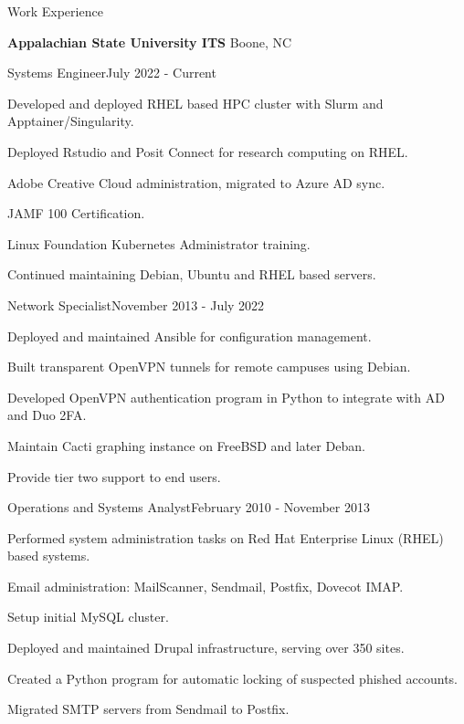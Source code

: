 \documentclass{new_cv} %
\begin{document}
\begin{rSection}{Work Experience}
	
 {\bf  {Appalachian State University ITS}} \hfill {Boone, NC}
 
   \begin{rSubsection}{Systems Engineer}{July 2022 - Current}
	\item Developed and deployed RHEL based HPC cluster with Slurm and Apptainer/Singularity.
	\item Deployed Rstudio and Posit Connect for research computing on RHEL.
 	\item Adobe Creative Cloud administration, migrated to Azure AD sync.
 	\item JAMF 100 Certification.
 	\item Linux Foundation Kubernetes Administrator training.
 	\item Continued maintaining Debian, Ubuntu and RHEL based servers.
 \end{rSubsection}

      \begin{rSubsection}{Network Specialist}{November 2013 - July 2022}
		\item Deployed and maintained Ansible for configuration management.
		\item Built transparent OpenVPN tunnels for remote campuses using Debian.
		\item Developed OpenVPN authentication program in Python to integrate with AD and Duo 2FA.
		\item Maintain Cacti graphing instance on FreeBSD and later Deban.
        \item Provide tier two support to end users.
      \end{rSubsection}
      
      \begin{rSubsection}{Operations and Systems Analyst}{February 2010 - November 2013}
		\item Performed system administration tasks on Red Hat Enterprise Linux (RHEL) based systems.
		\item Email administration: MailScanner, Sendmail, Postfix, Dovecot IMAP. 
		\item Setup initial MySQL cluster.
		\item Deployed and maintained Drupal infrastructure, serving over 350 sites.
		\item Created a Python program for automatic locking of suspected phished accounts.
		\item Migrated SMTP servers from Sendmail to Postfix.
       \end{rSubsection}
     

\end{rSection}
\end{document}
